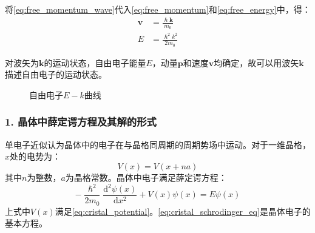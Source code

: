将\autoref{eq:free_momentum_wave}代入\autoref{eq:free_momentum}和\autoref{eq:free_energy}中，得：
\begin{align}
    \bm v&=\frac{\hslash\bm k}{m_0}\label{eq:free_e_wave_velocity}\\
    E&=\frac{\hslash^2k^2}{2m_0}\label{eq:free_e_wave_energy}
\end{align}

对波矢为$\bm k$的运动状态，自由电子能量$E$，动量$\bm p$和速度$\bm v$均确定，故可以用波矢$\bm k$描述自由电子的运动状态。

\begin{figure}[H]
    \centering
{} %

    \caption{自由电子$E-k$曲线}
    \label{fig:free_e_E-k}
\end{figure}

\subsubsection{1. 晶体中薛定谔方程及其解的形式}

单电子近似认为晶体中的电子在与晶格同周期的周期势场中运动。对于一维晶格，$x$处的电势为：
\begin{equation}
    V(x)=V(x+na)\label{eq:cristal_potential}
\end{equation}
其中$n$为整数，$a$为晶格常数。晶体中电子满足薛定谔方程：
\begin{equation}
    -\frac{\hslash^2}{2m_0}\frac{\mathrm{d}^2\psi(x)}{\mathrm{d}x^2}+V(x)\psi(x)=E\psi(x)\label{eq:cristal_schrodinger_eq}
\end{equation}
上式中$V(x)$满足\autoref{eq:cristal_potential}。\autoref{eq:cristal_schrodinger_eq}是晶体电子的基本方程。

